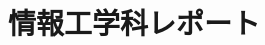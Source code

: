 \documentclass[a4paper, dvipdfmx]{jsarticle}
\title{情報工学科レポート}
\author{}
\begin{document}
\maketitle
\section{}


\end{document}
